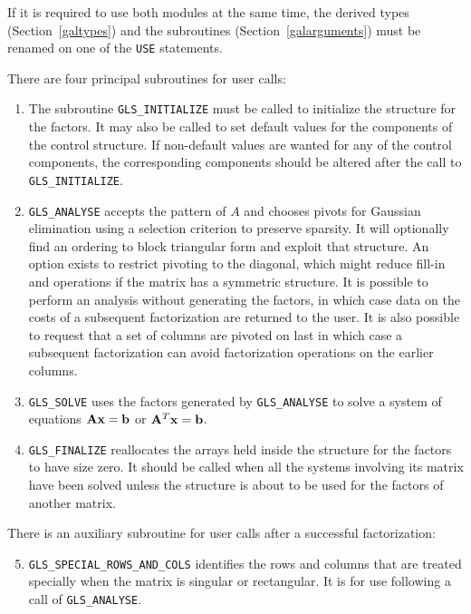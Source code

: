 \documentclass{galahad}
\newcommand{\packagename}{GLS}
\begin{document}
If it is required to use both modules at the same time, the derived types
(Section~\ref{galtypes})
and the subroutines
(Section~\ref{galarguments})
must be renamed on one of the {\tt USE} statements.

There are four principal subroutines for user calls:

\begin{enumerate}

\item The subroutine {\tt \packagename\_INITIALIZE} must be
called to initialize the
structure for the factors. It may also be called to set default values
for the components of the control structure. If non-default values are
wanted for any of the control components, the corresponding components
should be altered after the call to {\tt \packagename\_INITIALIZE}.

\item {\tt \packagename\_ANALYSE} accepts the pattern of $A$ and chooses
pivots for Gaussian elimination using a selection criterion to preserve
sparsity.  It will optionally find an ordering to block triangular form
and exploit that structure. An option exists to restrict pivoting to the
diagonal, which might reduce fill-in and operations if the matrix has a
symmetric structure. It is possible to perform an analysis without
generating the factors, in which case data on the costs of a subsequent
factorization are returned to the user.  It is also possible to request
that a set of columns are pivoted on last in which case a subsequent
factorization can avoid factorization operations on the earlier columns.

\item {\tt \packagename\_SOLVE} uses the factors generated by
{\tt \packagename\_ANALYSE} to
solve a system of equations ${\mathbf{A}} {\mathbf{x}} = {\mathbf{b}}$ or ${\mathbf{A}}^T {\mathbf{x}} = {\mathbf{b}}$.

\item {\tt \packagename\_FINALIZE} reallocates the arrays held inside
the structure for the factors to have size zero. It should be called
when all the systems involving its matrix have been solved unless the
structure is about to be used for the factors of another matrix.

\end{enumerate}

\noindent There is an auxiliary subroutine for user calls after a
successful factorization:

\begin{enumerate}
\setcounter{enumi}{4}

\item {\tt \packagename\_SPECIAL\_ROWS\_AND\_COLS} identifies the rows
and columns that are treated specially when the matrix is singular or
rectangular.  It is for use following a call of {\tt \packagename\_ANALYSE}.

\end{enumerate}
\end{document}
